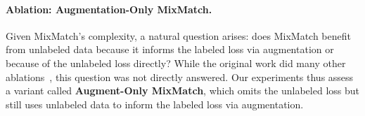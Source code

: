 



\paragraph{Ablation: Augmentation-Only MixMatch.}
Given MixMatch's complexity, a natural question arises: does MixMatch benefit from unlabeled data because it informs the labeled loss via augmentation or because of the unlabeled loss directly?
While the original work did many other ablations~\citep{berthelotMixmatchHolisticApproach2019}, this question was not directly answered.
Our experiments thus assess a variant called \textbf{Augment-Only MixMatch}, which omits the unlabeled loss but still uses unlabeled data to inform the labeled loss via augmentation.




